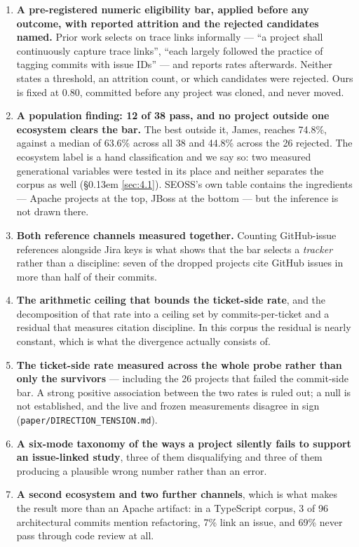 \documentclass[conference]{IEEEtran}
\begin{document}
\begin{enumerate}
\item \textbf{A pre-registered numeric eligibility bar, applied before any outcome, with reported attrition and the rejected candidates named.} Prior work selects on trace links informally --- ``a project shall continuously capture trace links'', ``each largely followed the practice of tagging commits with issue IDs'' --- and reports rates afterwards. Neither states a threshold, an attrition count, or which candidates were rejected. Ours is fixed at 0.80, committed before any project was cloned, and never moved.
\item \textbf{A population finding: 12 of 38 pass, and no project outside one ecosystem clears the bar.} The best outside it, James, reaches 74.8\%, against a median of 63.6\% across all 38 and 44.8\% across the 26 rejected. The ecosystem label is a hand classification and we say so: two measured generational variables were tested in its place and neither separates the corpus as well (\S\kern0.13em \ref{sec:4.1}). SEOSS's own table contains the ingredients --- Apache projects at the top, JBoss at the bottom --- but the inference is not drawn there.
\item \textbf{Both reference channels measured together.} Counting GitHub-issue references alongside Jira keys is what shows that the bar selects a \emph{tracker} rather than a discipline: seven of the dropped projects cite GitHub issues in more than half of their commits.
\item \textbf{The arithmetic ceiling that bounds the ticket-side rate}, and the decomposition of that rate into a ceiling set by commits-per-ticket and a residual that measures citation discipline. In this corpus the residual is nearly constant, which is what the divergence actually consists of.
\item \textbf{The ticket-side rate measured across the whole probe rather than only the survivors} --- including the 26 projects that failed the commit-side bar. A strong positive association between the two rates is ruled out; a null is not established, and the live and frozen measurements disagree in sign (\texttt{paper/\allowbreak{}DIRECTION\_\allowbreak{}TENSION.\allowbreak{}md}).
\item \textbf{A six-mode taxonomy of the ways a project silently fails to support an issue-linked study}, three of them disqualifying and three of them producing a plausible wrong number rather than an error.
\item \textbf{A second ecosystem and two further channels}, which is what makes the result more than an Apache artifact: in a TypeScript corpus, 3 of 96 architectural commits mention refactoring, 7\% link an issue, and 69\% never pass through code review at all.
\end{enumerate}
\end{document}

